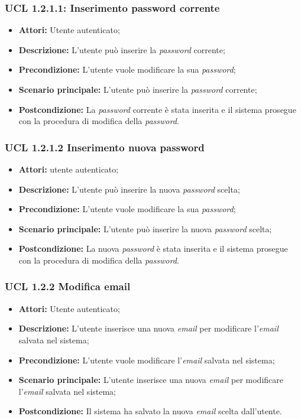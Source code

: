 \hypertarget{L1.2.1.1}{}
\subsubsection{UCL 1.2.1.1: Inserimento password corrente}
\begin{itemize}
	\item \textbf{Attori:} Utente autenticato;
	\item \textbf{Descrizione:} L'utente può inserire la \textit{password} corrente;
	\item \textbf{Precondizione:} L'utente vuole modificare la sua \textit{password};
	\item \textbf{Scenario principale:} L'utente può inserire la \textit{password} corrente;
	\item \textbf{Postcondizione:} La \textit{password} corrente è stata inserita e il sistema prosegue con la procedura di modifica della \textit{password}.
\end{itemize}

\hypertarget{L1.2.1.2}{}
\subsubsection{UCL 1.2.1.2 Inserimento nuova password}
\begin{itemize}
	\item \textbf{Attori: } utente autenticato;
	\item \textbf{Descrizione:} L'utente può inserire la nuova \textit{password} scelta;
	\item \textbf{Precondizione:} L'utente vuole modificare la sua \textit{password};
	\item \textbf{Scenario principale:} L'utente può inserire la nuova \textit{password} scelta;
	\item \textbf{Postcondizione:} La nuova \textit{password} è stata inserita e il sistema prosegue con la procedura di modifica della \textit{password}.
\end{itemize}

\hypertarget{L1.2.2}{}
\subsubsection{UCL 1.2.2  Modifica email}
\begin{itemize}
\item \textbf{Attori:} Utente autenticato;
\item \textbf{Descrizione:} L'utente inserisce una nuova \textit{email} per modificare l'\textit{email} salvata nel sistema;
\item \textbf{Precondizione:} L'utente vuole modificare l'\textit{email} salvata nel sistema;
\item \textbf{Scenario principale:} L'utente inserisce una nuova \textit{email} per modificare l'\textit{email} salvata nel sistema;
\item \textbf{Postcondizione:} Il sistema ha salvato la nuova \textit{email} scelta dall'utente.
\end{itemize}

